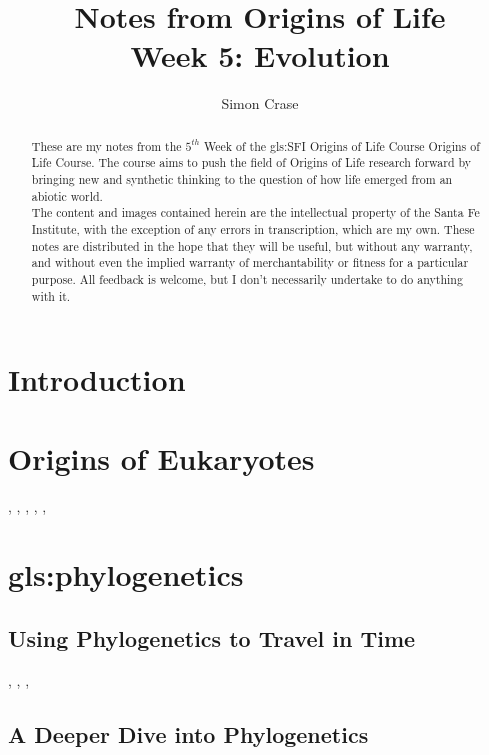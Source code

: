 \documentclass[]{article}
\title{
	Notes from Origins of Life\\
	Week 5: Evolution}
\author{Simon Crase}
\begin{document}
\maketitle

\begin{abstract}
   These are my notes from the $5^{th}$ Week of the \gls{gls:SFI} Origins of Life Course Origins of Life Course\cite{sfi2019}. The course aims to push the field of Origins of Life research forward by bringing new and synthetic thinking to the question of how life emerged from an abiotic world.\\
   The content and images contained herein are the intellectual property of the Santa Fe Institute, with the exception of any errors in transcription, which are my own.
   These notes are distributed in the hope that they will be useful,
   but without any warranty, and without even the implied warranty of
   merchantability or fitness for a particular purpose. All feedback is welcome,
   but I don't necessarily undertake to do anything with it.
\end{abstract}

\setcounter{tocdepth}{2}
\tableofcontents


\section{Introduction}

\section{Origins of Eukaryotes}

\cite{baum2014inside}, \cite{germot1996presence}, \cite{javaux2003recognizing}, \cite{lane2010energetics}, \cite{spang2015complex}, \cite{thiergart2012evolutionary}

\section{\Gls{gls:phylogenetics}}


\subsection{Using Phylogenetics to Travel in Time}

\cite{hillis1996molecular}, \cite{zuckerkandl1965molecules}, \cite{williams2006assessing}, \cite{woese2002evolution}

\subsection{A Deeper Dive into Phylogenetics}
\end{document}
